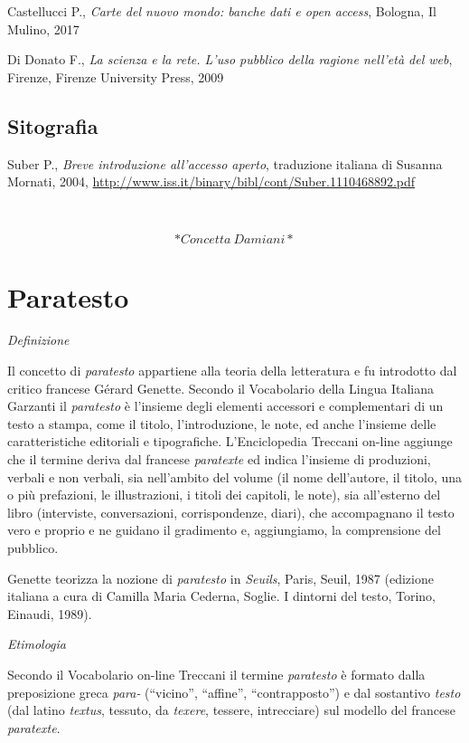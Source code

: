 \documentclass[
  b5paper,
  twoside,
  12pt,
  chapterprefix=false,
  bibliography=totocnumbered,
  parskip=false]{scrbook}
\begin{document}
Castellucci P., \emph{Carte del nuovo mondo: banche dati e open access},
Bologna, Il Mulino, 2017

Di Donato F., \emph{La scienza e la rete. L'uso pubblico della ragione
nell'età del web}, Firenze, Firenze University Press, 2009

\hypertarget{sitografia-25}{%
\section*{Sitografia}\label{sitografia-25}}

Suber P., \emph{Breve introduzione all'accesso aperto}, traduzione italiana
di Susanna Mornati, 2004,
\url{http://www.iss.it/binary/bibl/cont/Suber.1110468892.pdf}

~

\[*Concetta~Damiani*\]

\hypertarget{paratesto}{%
\chapter{Paratesto}\label{paratesto}}

\emph{Definizione}

Il concetto di \emph{paratesto} appartiene alla teoria della letteratura e fu
introdotto dal critico francese Gérard Genette. Secondo il Vocabolario
della Lingua Italiana Garzanti il \emph{paratesto} è l'insieme degli elementi
accessori e complementari di un testo a stampa, come il titolo,
l'introduzione, le note, ed anche l'insieme delle caratteristiche
editoriali e tipografiche. L'Enciclopedia Treccani on-line aggiunge che
il termine deriva dal francese \emph{paratexte} ed indica l'insieme di
produzioni, verbali e non verbali, sia nell'ambito del volume (il nome
dell'autore, il titolo, una o più prefazioni, le illustrazioni, i titoli
dei capitoli, le note), sia all'esterno del libro (interviste,
conversazioni, corrispondenze, diari), che accompagnano il testo vero e
proprio e ne guidano il gradimento e, aggiungiamo, la comprensione del
pubblico.

Genette teorizza la nozione di \emph{paratesto} in \emph{Seuils}, Paris, Seuil,
1987 (edizione italiana a cura di Camilla Maria Cederna, Soglie. I
dintorni del testo, Torino, Einaudi, 1989).

\emph{Etimologia}

Secondo il Vocabolario on-line Treccani il termine \emph{paratesto} è formato
dalla preposizione greca \emph{para-} (\enquote{vicino}, \enquote{affine}, \enquote{contrapposto}) e
dal sostantivo \emph{testo} (dal latino \emph{textus}, tessuto, da \emph{texere},
tessere, intrecciare) sul modello del francese \emph{paratexte}.
\end{document}
